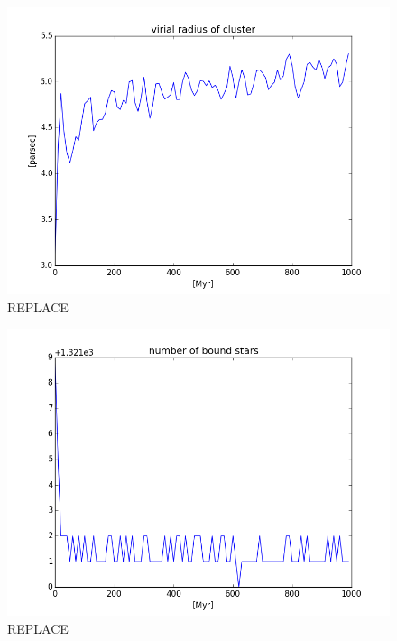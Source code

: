\documentclass{aa}
\begin{document}
\begin{figure}
    \centering
    \includegraphics[width=\hsize]{img/cluster_virial_radius.png}
    \caption{REPLACE}\label{fig:virial_radius}
\end{figure}

\begin{figure}
    \centering
    \includegraphics[width=\hsize]{img/bound_stars.png}
    \caption{REPLACE}\label{fig:bound_stars}
\end{figure}
\end{document}
